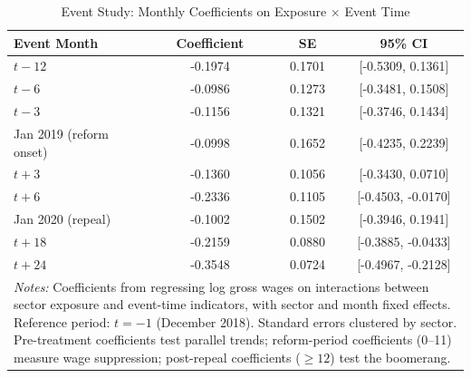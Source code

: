 \begin{table}[htbp]
\centering
\caption{Event Study: Monthly Coefficients on Exposure $\times$ Event Time}
\label{tab:eventstudy}
\begin{tabular}{lccc}
\hline\hline
Event Month & Coefficient & SE & 95\% CI \\
\hline
$t-12$ & -0.1974 & 0.1701 & [-0.5309, 0.1361] \\
$t-6$ & -0.0986 & 0.1273 & [-0.3481, 0.1508] \\
$t-3$ & -0.1156 & 0.1321 & [-0.3746, 0.1434] \\
Jan 2019 (reform onset) & -0.0998 & 0.1652 & [-0.4235, 0.2239] \\
$t+3$ & -0.1360 & 0.1056 & [-0.3430, 0.0710] \\
$t+6$ & -0.2336 & 0.1105 & [-0.4503, -0.0170] \\
Jan 2020 (repeal) & -0.1002 & 0.1502 & [-0.3946, 0.1941] \\
$t+18$ & -0.2159 & 0.0880 & [-0.3885, -0.0433] \\
$t+24$ & -0.3548 & 0.0724 & [-0.4967, -0.2128] \\
\hline\hline
\multicolumn{4}{p{0.85\textwidth}}{\footnotesize \textit{Notes:} Coefficients from regressing log gross wages on interactions between sector exposure and event-time indicators, with sector and month fixed effects. Reference period: $t=-1$ (December 2018). Standard errors clustered by sector. Pre-treatment coefficients test parallel trends; reform-period coefficients (0--11) measure wage suppression; post-repeal coefficients ($\geq 12$) test the boomerang.}
\end{tabular}
\end{table}

